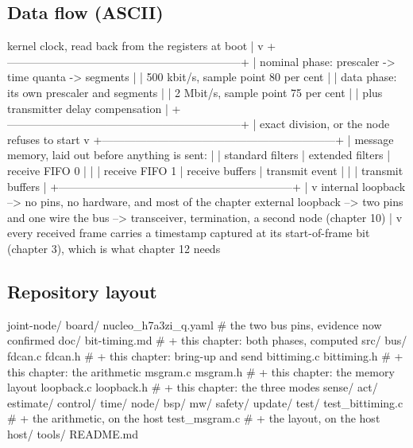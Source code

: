 \subsection*{Data flow (ASCII)}

\begin{asciiart}
  kernel clock, read back from the registers at boot
        |
        v
  +---------------------------------------------------------------+
  | nominal phase:  prescaler -> time quanta -> segments           |
  |                 500 kbit/s, sample point 80 per cent            |
  | data phase:     its own prescaler and segments                  |
  |                 2 Mbit/s, sample point 75 per cent              |
  |                 plus transmitter delay compensation             |
  +---------------------------------------------------------------+
        |  exact division, or the node refuses to start
        v
  +---------------------------------------------------------------+
  | message memory, laid out before anything is sent:              |
  |   standard filters | extended filters | receive FIFO 0 |        |
  |   receive FIFO 1   | receive buffers  | transmit event |        |
  |   transmit buffers                                              |
  +---------------------------------------------------------------+
        |
        v
  internal loopback  --> no pins, no hardware, and most of the chapter
  external loopback  --> two pins and one wire
  the bus            --> transceiver, termination, a second node (chapter 10)
        |
        v
  every received frame carries a timestamp captured at its start-of-frame bit
  (chapter 3), which is what chapter 12 needs
\end{asciiart}

\subsection*{Repository layout}

\begin{plaincode}
joint-node/
  board/  nucleo_h7a3zi_q.yaml        # the two bus pins, evidence now confirmed
  doc/    bit-timing.md               # + this chapter: both phases, computed
  src/
    bus/
      fdcan.c     fdcan.h             # + this chapter: bring-up and send
      bittiming.c bittiming.h         # + this chapter: the arithmetic
      msgram.c    msgram.h            # + this chapter: the memory layout
      loopback.c  loopback.h          # + this chapter: the three modes
    sense/ act/ estimate/ control/ time/ node/ bsp/
    mw/  safety/  update/
  test/
    test_bittiming.c                  # + the arithmetic, on the host
    test_msgram.c                     # + the layout, on the host
  host/  tools/  README.md
\end{plaincode}


